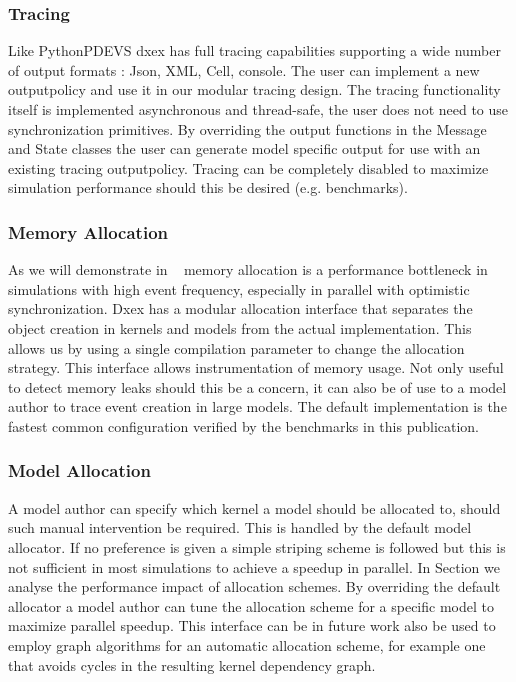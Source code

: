 \subsubsection{Tracing}
Like PythonPDEVS dxex has full tracing capabilities supporting a wide number of output formats : Json, XML, Cell, console. The user can implement a new outputpolicy and use it in our modular tracing design. The tracing functionality itself is implemented asynchronous and thread-safe, the user does not need to use synchronization primitives. By overriding the output functions in the Message and State classes the user can generate model specific output for use with an existing tracing outputpolicy. Tracing can be completely disabled to maximize simulation performance should this be desired (e.g. benchmarks). 
\subsubsection{Memory Allocation}
As we will demonstrate in ~ memory allocation is a performance bottleneck in simulations with high event frequency, especially in parallel with optimistic synchronization. Dxex has a modular allocation interface that separates the object creation in kernels and models from the actual implementation. This allows us by using a single compilation parameter to change the allocation strategy. This interface allows instrumentation of memory usage. Not only useful to detect memory leaks should this be a concern, it can also be of use to a model author to trace event creation in large models. The default implementation is the fastest common configuration verified by the benchmarks in this publication.
\subsubsection{Model Allocation}
A model author can specify which kernel a model should be allocated to, should such manual intervention be required. This is handled by the default model allocator. If no preference is given a simple striping scheme is followed but this is not sufficient in most simulations to achieve a speedup in parallel. In Section  we analyse the performance impact of allocation schemes. By overriding the default allocator a model author can tune the allocation scheme for a specific model to maximize parallel speedup. This interface can be in future work also be used to employ graph algorithms for an automatic allocation scheme, for example one that avoids cycles in the resulting kernel dependency graph.
